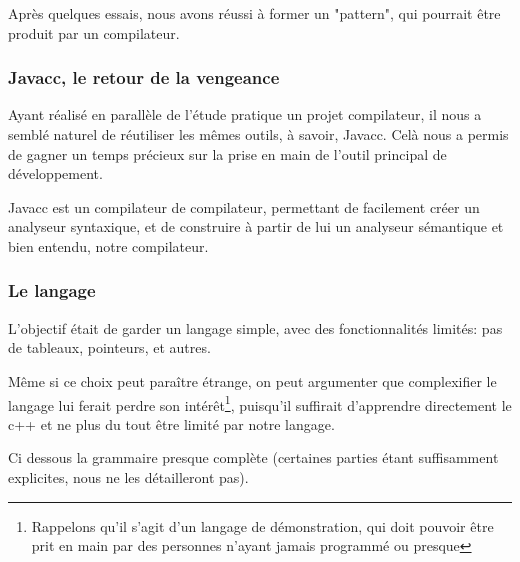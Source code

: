 \documentclass[a4paper,11pt]{article}
\begin{document}
        Après quelques essais, nous avons réussi à former un "pattern", qui pourrait être produit par un compilateur.

    \subsubsection{Javacc, le retour de la vengeance}
        Ayant réalisé en parallèle de l'étude pratique un projet compilateur, il nous a semblé naturel de réutiliser les mêmes outils, à savoir, Javacc. Celà nous a permis de gagner un temps précieux sur la prise en main de l'outil principal de développement.

        Javacc est un compilateur de compilateur, permettant de facilement créer un analyseur syntaxique, et de construire à partir de lui un analyseur sémantique et bien entendu, notre compilateur.

    \subsubsection{Le langage}
        L'objectif était de garder un langage simple, avec des fonctionnalités limités: pas de tableaux, pointeurs, et autres.

        Même si ce choix peut paraître étrange, on peut argumenter que complexifier le langage lui ferait perdre son intérêt\footnote{Rappelons qu'il s'agit d'un langage de démonstration, qui doit pouvoir être prit en main par des personnes n'ayant jamais programmé ou presque}, puisqu'il suffirait d'apprendre directement le c++ et ne plus du tout être limité par notre langage.
        
        Ci dessous la grammaire presque complète (certaines parties étant suffisamment explicites, nous ne les détailleront pas).
\end{document}
